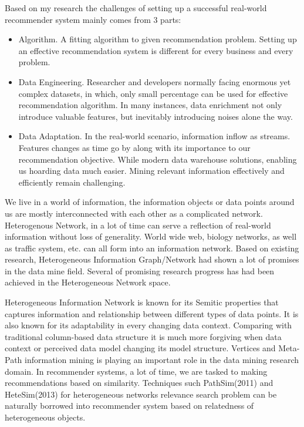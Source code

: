 \documentclass[12pt,a4 paper,title page]{article}
\begin{document}
Based on my research the challenges of setting up a successful real-world recommender system mainly comes from 3 parts:  
\begin{itemize}
\item Algorithm. A fitting algorithm to given recommendation problem. Setting up an effective recommendation system is different for every business and every problem. 

\item Data Engineering. Researcher and developers normally facing enormous yet complex datasets, in which, only small percentage can be used for effective recommendation algorithm. In many instances, data enrichment not only introduce valuable features, but inevitably introducing noises alone the way.  

\item Data Adaptation. In the real-world scenario, information inflow as streams. Features changes as time go by along with its importance to our recommendation objective. While modern data warehouse solutions, enabling us hoarding data much easier. Mining relevant information effectively and efficiently remain challenging. 
\end{itemize}

We live in a world of information, the information objects or data points around us are mostly interconnected with each other as a complicated network. Heterogenous Network, in a lot of time can serve a reflection of real-world information without loss of generality. World wide web, biology networks, as well as traffic system, etc. can all form into an information network. Based on existing research, Heterogeneous Information Graph/Network had shown a lot of promises in the data mine field. Several of promising research progress has had been achieved in the Heterogeneous Network space. 

Heterogeneous Information Network is known for its Semitic properties that captures information and relationship between different types of data points. It is also known for its adaptability in every changing data context. Comparing with traditional column-based data structure it is much more forgiving when data context or perceived data model changing its model structure. Vertices and Meta-Path information mining is playing an important role in the data mining research domain. In recommender systems, a lot of time, we are tasked to making recommendations based on similarity. Techniques such PathSim(2011) and HeteSim(2013) for heterogeneous networks relevance search problem can be naturally borrowed into recommender system based on relatedness of heterogeneous objects. 
\end{document}

